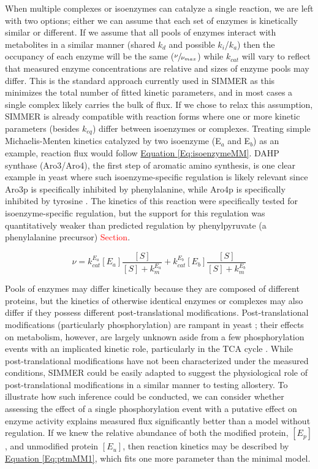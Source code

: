 When multiple complexes or isoenzymes can catalyze a single reaction, we are left with two options; either we can assume that each set of enzymes is kinetically similar or different. If we assume that all pools of enzymes interact with metabolites in a similar manner (shared $k_{d}$ and possible $k_{i}$/$k_{a}$) then the occupancy of each enzyme will be the same ($\sfrac{\nu}{\nu_{max}}$) while $k_{cat}$ will vary to reflect that measured enzyme concentrations are relative and sizes of enzyme pools may differ.  This is the standard approach currently used in SIMMER as this minimizes the total number of fitted kinetic parameters, and in most cases a single complex likely carries the bulk of flux. If we chose to relax this assumption, SIMMER is already  compatible with reaction forms where one or more kinetic parameters (besides $k_{eq}$) differ between isoenzymes or complexes. Treating simple Michaelis-Menten kinetics catalyzed by two isoenzyme (E$_{a}$ and E$_{b}$) as an example, reaction flux would follow \hyperref[Eq:isoenzymeMM]{Equation \ref{Eq:isoenzymeMM}}. DAHP synthase (Aro3/Aro4), the first step of aromatic amino synthesis, is one clear example in yeast where such isoenzyme-specific regulation is likely relevant since Aro3p is specifically inhibited by phenylalanine, while Aro4p is specifically inhibited by tyrosine \cite{Schnappauf:1998ec}. The kinetics of this reaction were specifically tested for isoenzyme-specific regulation, but the support for this regulation was quantitatively weaker than predicted regulation by phenylpyruvate (a phenylalanine precursor) \textcolor{red}{Section}. 

\begin{equation}
\nu = k_{cat}^{E_{a}}\left[E_{a}\right]\frac{\left[S\right]}{\left[S\right] + k_{m}^{E_{a}}} + k_{cat}^{E_{b}}\left[E_{b}\right]\frac{\left[S\right]}{\left[S\right] + k_{m}^{E_{b}}}\label{Eq:isoenzymeMM}
\end{equation}

Pools of enzymes may differ kinetically because they are composed of different proteins, but the kinetics of otherwise identical enzymes or complexes may also differ if they possess different post-translational modifications.  Post-translational modifications (particularly phosphorylation) are rampant in yeast \cite{Fiedler:2009hx}; their effects on metabolism, however, are largely unknown aside from a few phosphorylation events with an implicated kinetic role, particularly in the TCA cycle \cite{Schulz:2014eo}. While post-translational modifications have not been characterized under the measured conditions, SIMMER could be easily adapted to suggest the physiological role of post-translational modifications in a similar manner to testing allostery. To illustrate how such inference could be conducted, we can consider whether assessing the effect of a single phosphorylation event with a putative effect on enzyme activity explains measured flux significantly better than a model without regulation. If we knew the relative abundance of both the modified protein, $\left[E_{p}\right]$, and unmodified protein $\left[E_{u}\right]$, then reaction kinetics may be described by \hyperref[Eq:ptmMM1]{Equation \ref{Eq:ptmMM1}}, which fits one more parameter than the minimal model.


